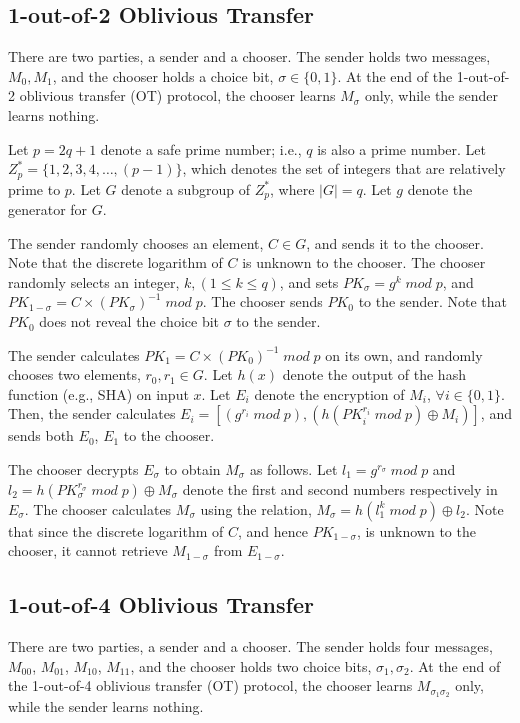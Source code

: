 \documentclass[10pt,journal,cspaper,compsoc]{IEEEtran}
\begin{document}
\subsection{1-out-of-2 Oblivious Transfer}
\label{sec_1_out_of_2_OT}
There are two parties, a sender and a chooser. The sender holds two messages, $M_0,M_1$, and the chooser holds a choice bit, $\sigma \in \{0,1\}$. At the end of the 1-out-of-2 oblivious transfer (OT) protocol, the chooser learns $M_\sigma$ only, while the sender learns nothing.


Let $p=2q+1$ denote a safe prime number; i.e., $q$ is also a prime number. Let $Z_p^*=\{1,2,3,4,\ldots ,(p-1)\}$, which denotes the set of integers that are relatively prime to $p$. Let $G$ denote a subgroup of $Z_p^*$, where $|G|=q$. Let $g$ denote the generator for $G$.


The sender randomly chooses an element, $C\in G$, and sends it to the chooser. Note that the discrete logarithm of $C$ is unknown to the chooser. The chooser randomly selects an integer, $k, (1\le k\le q)$, and sets $PK_\sigma=g^k\; mod\; p$, and $PK_{1-\sigma}=C\times(PK_\sigma)^{-1}\; mod\; p$. The chooser sends $PK_0$ to the sender. Note that $PK_0$ does not reveal the choice bit $\sigma$ to the sender.


The sender calculates $PK_1=C\times (PK_0)^{-1}\; mod\; p$ on its own, and randomly chooses two elements, $r_0,r_1\in G$. Let $h(x)$ denote the output of the hash function (e.g., SHA) on input $x$. Let $E_i$ denote the encryption of $M_i$, $\forall i\in\{0,1\}$. Then, the sender calculates $E_i=[(g^{r_i}\; mod\; p),(h(PK_i^{r_i}\; mod\; p)\oplus M_i)]$, and sends both $E_0$, $E_1$ to the chooser.


The chooser decrypts $E_\sigma$ to obtain $M_\sigma$ as follows. Let $l_1=g^{r_\sigma}\; mod\; p$ and $l_2=h(PK_\sigma^{r_\sigma}\; mod\; p)\oplus M_\sigma$ denote the first and second numbers respectively in $E_\sigma$. The chooser calculates $M_\sigma$ using the relation, $M_\sigma=h(l_1^k\; mod\; p)\oplus l_2$. Note that since the discrete logarithm of $C$, and hence $PK_{1-\sigma}$, is unknown to the chooser, it cannot retrieve $M_{1-\sigma}$ from $E_{1-\sigma}$.


\subsection{1-out-of-4 Oblivious Transfer}
\label{sec_1_out_of_4_OT}

There are two parties, a sender and a chooser. The sender holds four messages, $M_{00}$, $M_{01}$, $M_{10}$, $M_{11}$, and the chooser holds two choice bits, $\sigma_1,\sigma_2$. At the end of the 1-out-of-4 oblivious transfer (OT) protocol, the chooser learns $M_{\sigma_1 \sigma_2}$ only, while the sender learns nothing.
\end{document}
